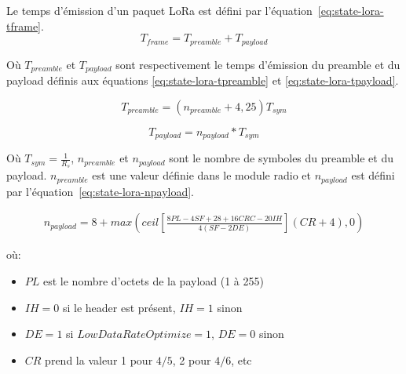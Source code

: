 Le temps d'émission d'un paquet LoRa est défini par l'équation~\ref{eq:state-lora-tframe}.
\begin{equation}\label{eq:state-lora-tframe}
    T_{frame} = T_{preamble} + T_{payload}
\end{equation}

Où $T_{preamble}$ et $T_{payload}$ sont respectivement le temps d'émission du preamble et du payload définis aux équations \ref{eq:state-lora-tpreamble} et \ref{eq:state-lora-tpayload}.

\begin{equation}\label{eq:state-lora-tpreamble}
    T_{preamble} = (n_{preamble} + 4,25)T_{sym}
\end{equation}

\begin{equation}\label{eq:state-lora-tpayload}
    T_{payload} = n_{payload} * T_{sym}
\end{equation}

Où $T_{sym} = \frac{1}{R_s}$, $n_{preamble}$ et $n_{payload}$ sont le nombre de symboles du preamble et du payload. $n_{preamble}$ est une valeur définie dans le module radio et $n_{payload}$ est défini par l'équation~\ref{eq:state-lora-npayload}.

\begin{equation}\label{eq:state-lora-npayload}
    \begin{split}
    n_{payload} =8 +max
     \left( ceil \left[ \frac{8PL - 4SF + 28 + 16CRC - 20IH}{4(SF-2DE)} \right] (CR+4), 0 \right)
    \end{split}
\end{equation}

où:
\begin{itemize}
    \item $PL$ est le nombre d'octets de la payload (1 à 255)
    \item $IH=0$ si le header est présent, $IH=1$ sinon
    \item $DE=1$ si $LowDataRateOptimize=1$, $DE=0$ sinon
    \item $CR$ prend la valeur 1 pour $4/5$, 2 pour $4/6$, etc
\end{itemize}
